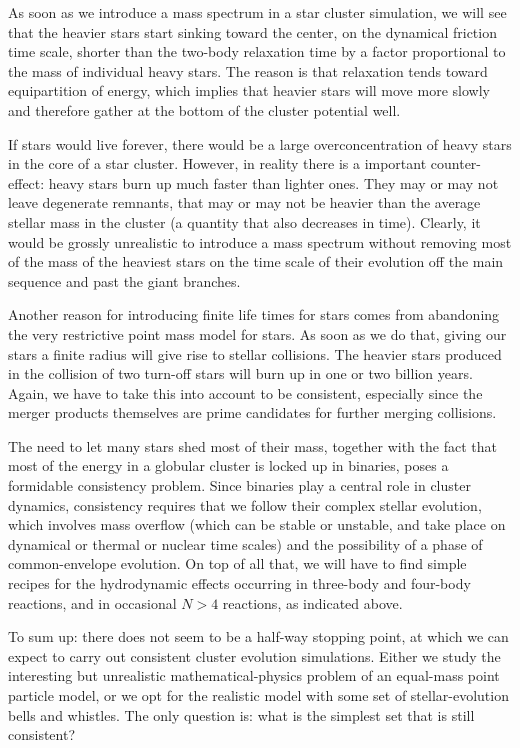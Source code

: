 As soon as we introduce a mass spectrum in a star cluster simulation,
we will see that the heavier stars start sinking toward the center, on
the dynamical friction time scale, shorter than the two-body
relaxation time by a factor proportional to the mass of individual
heavy stars.  The reason is that relaxation tends toward equipartition
of energy, which implies that heavier stars will move more slowly and
therefore gather at the bottom of the cluster potential well.

If stars would live forever, there would be a large overconcentration
of heavy stars in the core of a star cluster.  However, in reality
there is a important counter-effect: heavy stars burn up much faster
than lighter ones.  They may or may not leave degenerate remnants, that
may or may not be heavier than the average stellar mass in the cluster
(a quantity that also decreases in time).  Clearly, it would be
grossly unrealistic to introduce a mass spectrum without removing most
of the mass of the heaviest stars on the time scale of their evolution
off the main sequence and past the giant branches.

Another reason for introducing finite life times for stars comes from
abandoning the very restrictive point mass model for stars.  As soon
as we do that, giving our stars a finite radius will give rise to
stellar collisions.  The heavier stars produced in the collision of two
turn-off stars will burn up in one or two billion years.  Again, we
have to take this into account to be consistent, especially since the
merger products themselves are prime candidates for further merging
collisions.

The need to let many stars shed most of their mass, together with the
fact that most of the energy in a globular cluster is locked up in
binaries, poses a formidable consistency problem.  Since binaries play
a central role in cluster dynamics, consistency requires that we
follow their complex stellar evolution, which involves mass overflow
(which can be stable or unstable, and take place on dynamical or
thermal or nuclear time scales) and the possibility of a phase of
common-envelope evolution.  On top of all that, we will have to find
simple recipes for the hydrodynamic effects occurring in three-body and
four-body reactions, and in occasional $N>4$ reactions, as indicated
above.

To sum up: there does not seem to be a half-way stopping point, at
which we can expect to carry out consistent cluster evolution
simulations.  Either we study the interesting but unrealistic
mathematical-physics problem of an equal-mass point particle model, or
we opt for the realistic model with some set of stellar-evolution
bells and whistles.  The only question is: what is the simplest set
that is still consistent?

